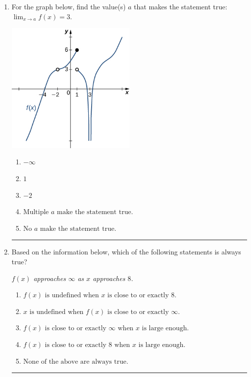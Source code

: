 \documentclass[14pt]{extbook}
\newcommand{\litem}[1]{\item#1\hspace*{-1cm}\rule{\textwidth}{0.4pt}}
\begin{document}
\begin{enumerate}
{\begin{enumerate}[label=\Alph*.]
\end{enumerate} }
\litem{
For the graph below, find the value(s) $a$ that makes the statement true: $ \displaystyle \lim_{x \rightarrow a} f(x) = 3$.
\begin{center}
    \includegraphics[width=0.5\textwidth]{../Figures/evaluateLimitGraphicallyCopyB.png}
\end{center}
\begin{enumerate}[label=\Alph*.]
\item \( -\infty \)
\item \( 1 \)
\item \( -2 \)
\item \( \text{Multiple } a \text{ make the statement true}. \)
\item \( \text{No } a \text{ make the statement true}. \)

\end{enumerate} }
\litem{
Based on the information below, which of the following statements is always true?
\begin{center}
    \textit{ $f(x)$ approaches $\infty$ as $x$ approaches $8$. }
\end{center}
\begin{enumerate}[label=\Alph*.]
\item \( f(x) \text{ is undefined when } x \text{ is close to or exactly } 8. \)
\item \( x \text{ is undefined when } f(x) \text{ is close to or exactly } \infty. \)
\item \( f(x) \text{ is close to or exactly } \infty \text{ when } x \text{ is large enough}. \)
\item \( f(x) \text{ is close to or exactly } 8 \text{ when } x \text{ is large enough}. \)
\item \( \text{None of the above are always true.} \)


\end{enumerate}}
\end{enumerate}
\end{document}
